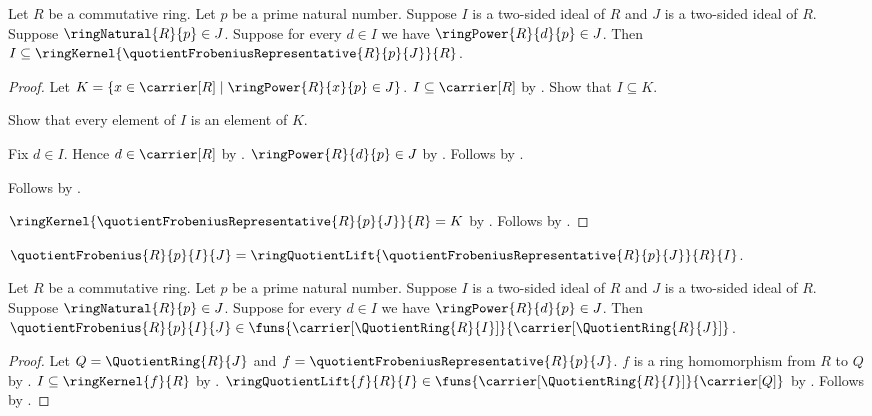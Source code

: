 \begin{theorem}\label{quotient_frobenius_source_ideal_in_kernel}
    Let $R$ be a commutative ring.
    Let $p$ be a prime natural number.
    Suppose $I$ is a two-sided ideal of $R$ and
        $J$ is a two-sided ideal of $R$.
    Suppose $\ringNatural{R}{p}\in J$.
    Suppose for every $d\in I$ we have
        $\ringPower{R}{d}{p}\in J$.
    Then $I\subseteq
        \ringKernel{\quotientFrobeniusRepresentative{R}{p}{J}}{R}$.
\end{theorem}
\begin{proof}
    Let $K=\{x\in\carrier[R]\mid\ringPower{R}{x}{p}\in J\}$.
    $I\subseteq\carrier[R]$ by
        .
    Show that $I\subseteq K$.
    \begin{subproof}
        Show that every element of $I$ is an element of $K$.
        \begin{subproof}
            Fix $d\in I$.
            Hence $d\in\carrier[R]$ by .
            $\ringPower{R}{d}{p}\in J$ by \auto.
            Follows by \auto.
        \end{subproof}
        Follows by .
    \end{subproof}
    $\ringKernel{\quotientFrobeniusRepresentative{R}{p}{J}}{R}=K$ by
        .
    Follows by \auto.
\end{proof}

\begin{definition}\label{quotient_frobenius}
    $\quotientFrobenius{R}{p}{I}{J}=
        \ringQuotientLift{
            \quotientFrobeniusRepresentative{R}{p}{J}}{R}{I}$.
\end{definition}

\begin{proposition}\label{quotient_frobenius_type}
    Let $R$ be a commutative ring.
    Let $p$ be a prime natural number.
    Suppose $I$ is a two-sided ideal of $R$ and
        $J$ is a two-sided ideal of $R$.
    Suppose $\ringNatural{R}{p}\in J$.
    Suppose for every $d\in I$ we have
        $\ringPower{R}{d}{p}\in J$.
    Then $\quotientFrobenius{R}{p}{I}{J}\in
        \funs{\carrier[\QuotientRing{R}{I}]}{
            \carrier[\QuotientRing{R}{J}]}$.
\end{proposition}
\begin{proof}
    Let $Q=\QuotientRing{R}{J}$ and
        $f=\quotientFrobeniusRepresentative{R}{p}{J}$.
    $f$ is a ring homomorphism from $R$ to $Q$ by
        .
    $I\subseteq\ringKernel{f}{R}$ by
        .
    $\ringQuotientLift{f}{R}{I}\in
        \funs{\carrier[\QuotientRing{R}{I}]}{\carrier[Q]}$ by
        .
    Follows by .
\end{proof}

